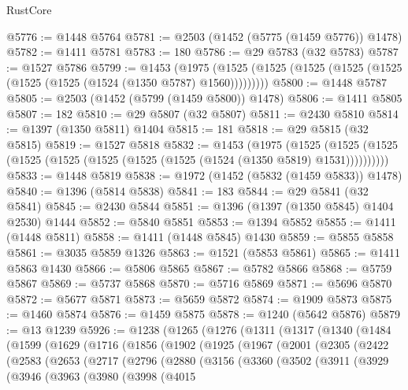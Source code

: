 \begin{lexlean}{RustCore}
\begin{coremodule}
@5776 := @1448 @5764
@5781 := @2503 (@1452 (@5775 (@1459 @5776)) @1478)
@5782 := @1411 @5781
@5783 := 180
@5786 := @29 @5783 (@32 @5783)
@5787 := @1527 @5786
@5799 := @1453
    (@1975 (@1525 (@1525 (@1525 (@1525 (@1525 (@1525 (@1525 (@1524 (@1350 @5787) @1560)))))))))
@5800 := @1448 @5787
@5805 := @2503 (@1452 (@5799 (@1459 @5800)) @1478)
@5806 := @1411 @5805
@5807 := 182
@5810 := @29 @5807 (@32 @5807)
@5811 := @2430 @5810
@5814 := @1397 (@1350 @5811) @1404
@5815 := 181
@5818 := @29 @5815 (@32 @5815)
@5819 := @1527 @5818
@5832 := @1453
    (@1975
      (@1525 (@1525 (@1525 (@1525 (@1525 (@1525 (@1525 (@1525 (@1524 (@1350 @5819) @1531))))))))))
@5833 := @1448 @5819
@5838 := @1972 (@1452 (@5832 (@1459 @5833)) @1478)
@5840 := @1396 (@5814 @5838)
@5841 := 183
@5844 := @29 @5841 (@32 @5841)
@5845 := @2430 @5844
@5851 := @1396 (@1397 (@1350 @5845) @1404 @2530) @1444
@5852 := @5840 @5851
@5853 := @1394 @5852
@5855 := @1411 (@1448 @5811)
@5858 := @1411 (@1448 @5845) @1430
@5859 := @5855 @5858
@5861 := @3035 @5859 @1326
@5863 := @1521 (@5853 @5861)
@5865 := @1411 @5863 @1430
@5866 := @5806 @5865
@5867 := @5782 @5866
@5868 := @5759 @5867
@5869 := @5737 @5868
@5870 := @5716 @5869
@5871 := @5696 @5870
@5872 := @5677 @5871
@5873 := @5659 @5872
@5874 := @1909 @5873
@5875 := @1460 @5874
@5876 := @1459 @5875
@5878 := @1240 (@5642 @5876)
@5879 := @13 @1239
@5926 := @1238
    (@1265
      (@1276
        (@1311
          (@1317
            (@1340
              (@1484
                (@1599
                  (@1629
                    (@1716
                      (@1856
                        (@1902
                          (@1925
                            (@1967
                              (@2001
                                (@2305
                                  (@2422
                                    (@2583
                                      (@2653
                                        (@2717
                                          (@2796
                                            (@2880
                                              (@3156
                                                (@3360
                                                  (@3502
                                                    (@3911
                                                      (@3929
                                                        (@3946
                                                          (@3963
                                                            (@3980
                                                              (@3998
                                                                (@4015

\end{coremodule}
\end{lexlean}
